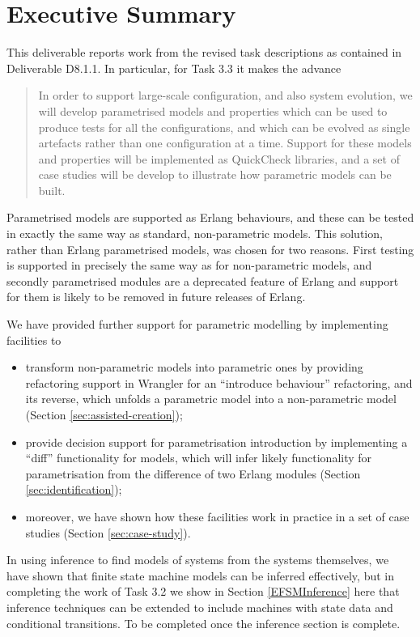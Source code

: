 \section*{Executive Summary}

This deliverable reports work from the revised task descriptions as contained in Deliverable D8.1.1. In particular, for Task 3.3 it makes the advance
\begin{quote}
In order to support large-scale configuration, and also system evolution, we will develop parametrised models and properties which can be used to produce tests for all the configurations, and which can be evolved as single artefacts rather than one configuration at a time. Support for these models and properties will be implemented as QuickCheck libraries, and a set of case studies will be develop to illustrate how parametric models can be built.
\end{quote}
Parametrised models are supported as Erlang behaviours, and these can be tested in exactly the same way as standard, non-parametric models. This solution, rather than Erlang parametrised models, was chosen for two reasons. First testing is supported in precisely the same way as for non-parametric models, and secondly parametrised modules are a deprecated feature of Erlang and support for them is likely to be removed in future releases of Erlang.

We have provided further support for parametric modelling by implementing facilities to
\begin{itemize}
\item
transform non-parametric models into parametric ones by providing refactoring support in Wrangler for an ``introduce behaviour'' refactoring, and its reverse, which unfolds a parametric model into a non-parametric model (Section \ref{sec:assisted-creation});
\item
provide decision support for parametrisation introduction by implementing a ``diff'' functionality for models, which will infer likely functionality for parametrisation from the difference of two Erlang modules (Section \ref{sec:identification});
\item
moreover, we have shown how these facilities work in practice in a set of case studies (Section \ref{sec:case-study}).
\end{itemize}


In using inference to find models of systems from the systems themselves, we have shown that finite state machine models can be inferred effectively, but in completing the work of Task 3.2 we show in Section \ref{EFSMInference} here that inference techniques can be extended to include machines with state data and conditional transitions. {\color{red} To be completed once the inference section is complete.}




\clearpage
